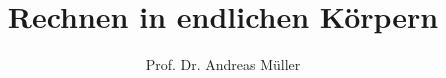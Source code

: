 %
%
%


\beamertemplatenavigationsymbolsempty
\title[Endliche Körper]{Rechnen in endlichen Körpern}
\author[A.~Müller]{Prof. Dr. Andreas Müller}
\date[]{}

